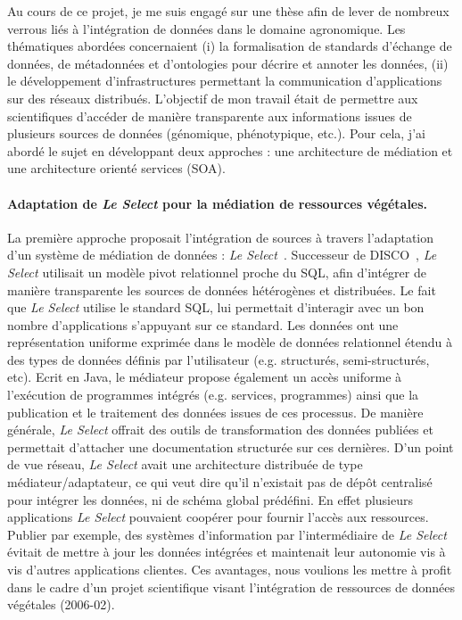 Au cours de ce projet, je me suis engagé sur une thèse afin de lever de nombreux verrous liés à l’intégration de données dans le domaine agronomique. Les thématiques abordées concernaient (i) la formalisation de standards d’échange de données, de métadonnées et d’ontologies pour décrire et annoter les données, (ii) le développement d’infrastructures permettant la communication d’applications sur des réseaux distribués. L’objectif de mon travail était de permettre aux scientifiques d'accéder de manière transparente aux informations issues de plusieurs sources de données (génomique, phénotypique, etc.).  Pour cela, j’ai abordé le sujet en développant deux approches : une architecture de médiation et une architecture orienté services (SOA).  

\paragraph*{Adaptation de \textit{Le Select} pour la médiation de ressources végétales.} La première approche proposait l'intégration de sources à travers l'adaptation d'un système de médiation de données : \textit{Le Select}~\cite{manolescu2002}. Successeur de DISCO~\cite{Tomasic1998}, \textit{Le Select} utilisait un modèle pivot relationnel proche du SQL, afin d’intégrer de manière transparente les sources de données hétérogènes et distribuées. Le fait que \textit{Le Select} utilise le standard SQL, lui permettait d’interagir avec un bon nombre d’applications s’appuyant sur ce standard.
Les données ont une représentation uniforme exprimée dans le modèle de données relationnel étendu à des types de données définis par l'utilisateur (e.g. structurés, semi-structurés, etc). Ecrit en Java, le médiateur propose également un accès uniforme à l’exécution de programmes intégrés (e.g. services, programmes) ainsi que la publication et le traitement des données issues de ces processus. De manière générale, \textit{Le Select} offrait des outils de transformation des données publiées et permettait d’attacher une documentation structurée sur ces dernières. D’un point de vue réseau, \textit{Le Select} avait une architecture distribuée de type médiateur/adaptateur, ce qui veut dire qu’il n’existait pas de dépôt centralisé pour intégrer les données, ni de schéma global prédéfini. En effet plusieurs applications \textit{Le Select} pouvaient coopérer pour fournir l'accès aux ressources. Publier par exemple, des systèmes d’information par l’intermédiaire de \textit{Le Select} évitait de mettre à jour les données intégrées et maintenait leur autonomie vis à vis d’autres applications clientes. Ces avantages, nous voulions les mettre à profit dans le cadre d’un projet scientifique visant l’intégration de ressources de données végétales (2006-02).\\

